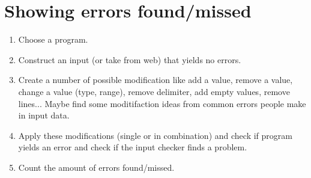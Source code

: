 \documentclass[11pt]{article}
\begin{document}
\section{Showing errors found/missed}

\begin{enumerate}
  \item Choose a program.
  \item Construct an input (or take from web) that yields no errors.
  \item Create a number of possible modification like add a value, remove a value, change a value (type, range), remove delimiter, add empty values, remove lines... Maybe find some moditifaction ideas from common errors people make in input data.
  \item Apply these modifications (single or in combination) and check if program yields an error and check if the input checker finds a problem.
  \item Count the amount of errors found/missed.
\end{enumerate}
\end{document}
